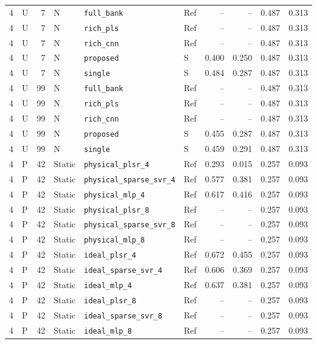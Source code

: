 \documentclass[10pt,a4paper]{article}
\begin{document}
\begin{longtable}{rlrlllrrrr}
4 & U & 7 & N & \texttt{full\_bank} & Ref & -- & -- & 0.487 & 0.313 \\
4 & U & 7 & N & \texttt{rich\_pls} & Ref & -- & -- & 0.487 & 0.313 \\
4 & U & 7 & N & \texttt{rich\_cnn} & Ref & -- & -- & 0.487 & 0.313 \\
4 & U & 7 & N & \texttt{proposed} & S & 0.400 & 0.250 & 0.487 & 0.313 \\
4 & U & 7 & N & \texttt{single} & S & 0.484 & 0.287 & 0.487 & 0.313 \\
4 & U & 99 & N & \texttt{full\_bank} & Ref & -- & -- & 0.487 & 0.313 \\
4 & U & 99 & N & \texttt{rich\_pls} & Ref & -- & -- & 0.487 & 0.313 \\
4 & U & 99 & N & \texttt{rich\_cnn} & Ref & -- & -- & 0.487 & 0.313 \\
4 & U & 99 & N & \texttt{proposed} & S & 0.455 & 0.287 & 0.487 & 0.313 \\
4 & U & 99 & N & \texttt{single} & S & 0.459 & 0.291 & 0.487 & 0.313 \\
4 & P & 42 & Static & \texttt{physical\_plsr\_4} & Ref & 0.293 & 0.015 & 0.257 & 0.093 \\
4 & P & 42 & Static & \texttt{physical\_sparse\_svr\_4} & Ref & 0.577 & 0.381 & 0.257 & 0.093 \\
4 & P & 42 & Static & \texttt{physical\_mlp\_4} & Ref & 0.617 & 0.416 & 0.257 & 0.093 \\
4 & P & 42 & Static & \texttt{physical\_plsr\_8} & Ref & -- & -- & 0.257 & 0.093 \\
4 & P & 42 & Static & \texttt{physical\_sparse\_svr\_8} & Ref & -- & -- & 0.257 & 0.093 \\
4 & P & 42 & Static & \texttt{physical\_mlp\_8} & Ref & -- & -- & 0.257 & 0.093 \\
4 & P & 42 & Static & \texttt{ideal\_plsr\_4} & Ref & 0.672 & 0.455 & 0.257 & 0.093 \\
4 & P & 42 & Static & \texttt{ideal\_sparse\_svr\_4} & Ref & 0.606 & 0.369 & 0.257 & 0.093 \\
4 & P & 42 & Static & \texttt{ideal\_mlp\_4} & Ref & 0.637 & 0.381 & 0.257 & 0.093 \\
4 & P & 42 & Static & \texttt{ideal\_plsr\_8} & Ref & -- & -- & 0.257 & 0.093 \\
4 & P & 42 & Static & \texttt{ideal\_sparse\_svr\_8} & Ref & -- & -- & 0.257 & 0.093 \\
4 & P & 42 & Static & \texttt{ideal\_mlp\_8} & Ref & -- & -- & 0.257 & 0.093 \\

\end{longtable}
\end{document}
